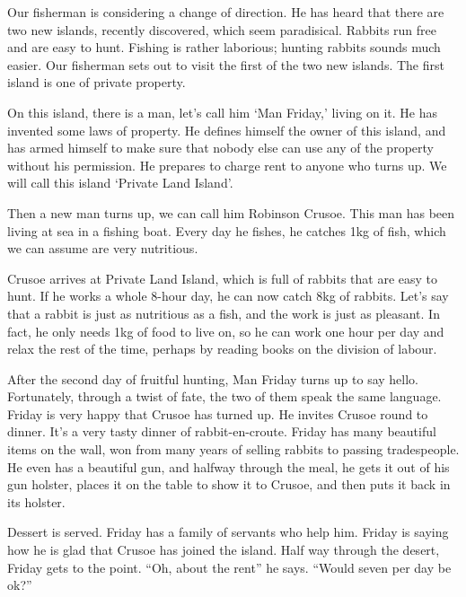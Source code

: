 \documentclass[]{tufte-handout}
\begin{document}
Our fisherman is considering a change of direction. He has heard that
there are two new islands, recently discovered, which seem paradisical.
Rabbits run free and are easy to hunt. Fishing is rather laborious;
hunting rabbits sounds much easier. Our fisherman sets out to visit the
first of the two new islands. The first island is one of private
property.

On this island, there is a man, let's call him `Man Friday,' living on
it. He has invented some laws of property. He defines himself the owner
of this island, and has armed himself to make sure that nobody else can
use any of the property without his permission. He prepares to charge
rent to anyone who turns up. We will call this island `Private Land
Island'.

Then a new man turns up, we can call him Robinson Crusoe. This man has
been living at sea in a fishing boat. Every day he fishes, he catches
1kg of fish, which we can assume are very nutritious.

Crusoe arrives at Private Land Island, which is full of rabbits that are
easy to hunt. If he works a whole 8-hour day, he can now catch 8kg of
rabbits. Let's say that a rabbit is just as nutritious as a fish, and
the work is just as pleasant. In fact, he only needs 1kg of food to live
on, so he can work one hour per day and relax the rest of the time,
perhaps by reading books on the division of labour.

After the second day of fruitful hunting, Man Friday turns up to say
hello. Fortunately, through a twist of fate, the two of them speak the
same language. Friday is very happy that Crusoe has turned up. He
invites Crusoe round to dinner. It's a very tasty dinner of
rabbit-en-croute. Friday has many beautiful items on the wall, won from
many years of selling rabbits to passing tradespeople. He even has a
beautiful gun, and halfway through the meal, he gets it out of his gun
holster, places it on the table to show it to Crusoe, and then puts it
back in its holster.

Dessert is served. Friday has a family of servants who help him. Friday
is saying how he is glad that Crusoe has joined the island. Half way
through the desert, Friday gets to the point. ``Oh, about the rent'' he
says. ``Would seven per day be ok?''
\end{document}
